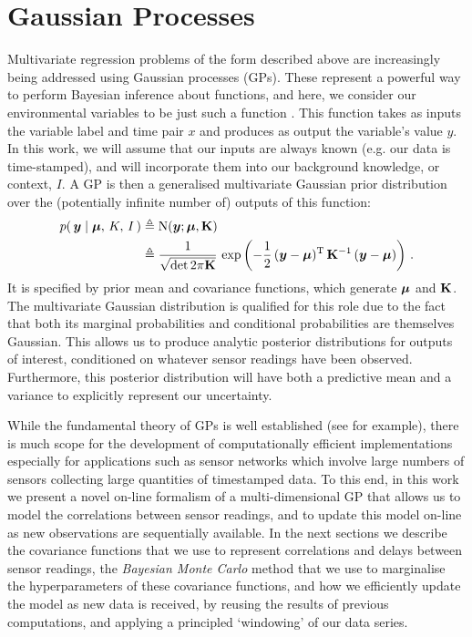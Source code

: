 \documentclass{acmtrans2m}
\begin{document}
\section{Gaussian Processes}\label{sec_gp}

\noindent Multivariate regression problems of the form described above are increasingly being addressed using Gaussian processes (GPs). These represent a powerful way to perform Bayesian inference about functions, and here, we consider our environmental variables to be just such a function \cite{GPsBook}. This function takes as inputs the variable label and time pair $x$ and produces as output the variable's value $y$. In this work, we will assume that our inputs are always known (e.g. our data is time-stamped), and will incorporate them into our background knowledge, or context, $I$. A GP is then a generalised multivariate Gaussian prior distribution over the (potentially infinite number of) outputs of this function:
\begin{align*}%
\p{\vy}{\vmu,\,K,\,I} & \defequal \N{\vy}{\vmu}{\mat{K}}\nonumber\\
& \defequal\frac{1}{\sqrt{\det{2\pi\mat{K}}}}\,\exp \left(-\frac{1}{2}\,(\vy-\vmu)^\tr\,\mat{K}^{-1}\,(\vy-\vmu)\right)\,.
\end{align*}
It is specified by prior mean and covariance functions, which generate $\boldsymbol{\mu}$ and $\mathbf{K}$.
 The multivariate Gaussian distribution is qualified for this role due to the fact that both its marginal probabilities and conditional probabilities are themselves Gaussian. This allows us to produce analytic posterior distributions for outputs of interest, conditioned on whatever sensor readings have been observed. Furthermore, this posterior distribution will have both a predictive mean and a variance to explicitly represent our uncertainty.

While the fundamental theory of GPs is well established (see  for example), there is much scope for the development of computationally efficient implementations especially for applications such as sensor networks which involve large numbers of sensors collecting large quantities of timestamped data. To this end, in this work we present a novel on-line formalism of a multi-dimensional GP that allows us to model the correlations between sensor readings, and to update this model on-line as new observations are sequentially available. In the next sections we describe the covariance functions that we use to represent correlations and delays between sensor readings, the {\em Bayesian Monte Carlo} method that we use to marginalise the hyperparameters of these covariance functions, and how we efficiently update the model as new data is received, by reusing the results of previous computations, and applying a principled `windowing' of our data series.
\end{document}
